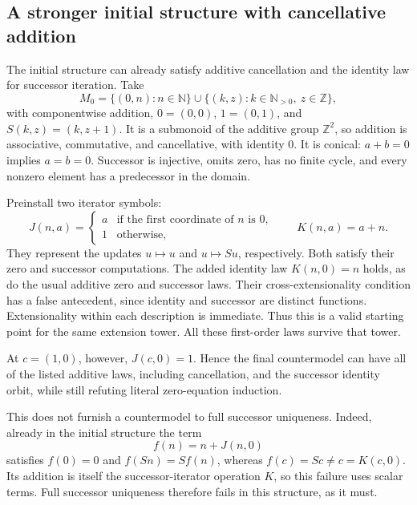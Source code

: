 \subsection{A stronger initial structure with cancellative addition}

The initial structure can already satisfy additive cancellation and the
identity law for successor iteration. Take
\[
 M_0=\{(0,n):n\in\mathbb N\}
     \cup\{(k,z):k\in\mathbb N_{>0},\ z\in\mathbb Z\},
\]
with componentwise addition, $0=(0,0)$, $1=(0,1)$, and
$S(k,z)=(k,z+1)$. It is a submonoid of the additive group $\mathbb Z^2$,
so addition is associative, commutative, and cancellative, with identity
$0$. It is conical: $a+b=0$ implies $a=b=0$. Successor is injective,
omits zero, has no finite cycle, and every nonzero element has a
predecessor in the domain.

Preinstall two iterator symbols:
\[
 J(n,a)=
 \begin{cases}
 a&\text{if the first coordinate of }n\text{ is }0,\\
 1&\text{otherwise},
 \end{cases}
 \qquad K(n,a)=a+n.
\]
They represent the updates $u\mapsto u$ and $u\mapsto Su$, respectively.
Both satisfy their zero and successor computations. The added identity
law $K(n,0)=n$ holds, as do the usual additive zero and successor laws.
Their cross-extensionality condition has a false antecedent, since
identity and successor are distinct functions. Extensionality within
each description is immediate. Thus this is a valid starting point for
the same extension tower. All these first-order laws survive that tower.

At $c=(1,0)$, however, $J(c,0)=1$. Hence the final countermodel can have
all of the listed additive laws, including cancellation, and the
successor identity orbit, while still refuting literal zero-equation
induction.

This does not furnish a countermodel to full successor uniqueness.
Indeed, already in the initial structure the term
\[
 f(n)=n+J(n,0)
\]
satisfies $f(0)=0$ and $f(Sn)=Sf(n)$, whereas
$f(c)=Sc\ne c=K(c,0)$. Its addition is itself the successor-iterator
operation $K$, so this failure uses scalar terms. Full successor
uniqueness therefore fails in this structure, as it must.
